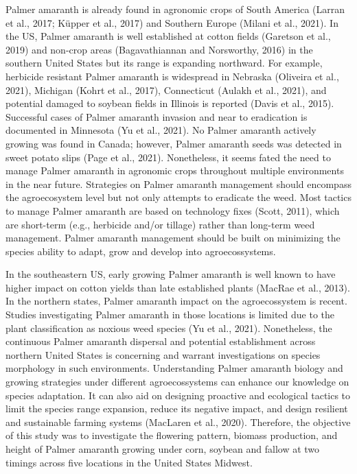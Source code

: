\documentclass[utf8]{frontiersSCNS}
\begin{document}
Palmer amaranth is already found in agronomic crops of South America
(Larran et al., 2017; Küpper et al., 2017) and Southern Europe (Milani
et al., 2021). In the US, Palmer amaranth is well established at cotton
fields (Garetson et al., 2019) and non-crop areas (Bagavathiannan and
Norsworthy, 2016) in the southern United States but its range is
expanding northward. For example, herbicide resistant Palmer amaranth is
widespread in Nebraska (Oliveira et al., 2021), Michigan (Kohrt et al.,
2017), Connecticut (Aulakh et al., 2021), and potential damaged to
soybean fields in Illinois is reported (Davis et al., 2015). Successful
cases of Palmer amaranth invasion and near to eradication is documented
in Minnesota (Yu et al., 2021). No Palmer amaranth actively growing was
found in Canada; however, Palmer amaranth seeds was detected in sweet
potato slips (Page et al., 2021). Nonetheless, it seems fated the need
to manage Palmer amaranth in agronomic crops throughout multiple
environments in the near future. Strategies on Palmer amaranth
management should encompass the agroecosystem level but not only
attempts to eradicate the weed. Most tactics to manage Palmer amaranth
are based on technology fixes (Scott, 2011), which are short-term (e.g.,
herbicide and/or tillage) rather than long-term weed management. Palmer
amaranth management should be built on minimizing the species ability to
adapt, grow and develop into agroecossystems.

In the southeastern US, early growing Palmer amaranth is well known to
have higher impact on cotton yields than late established plants (MacRae
et al., 2013). In the northern states, Palmer amaranth impact on the
agroecossystem is recent. Studies investigating Palmer amaranth in those
locations is limited due to the plant classification as noxious weed
species (Yu et al., 2021). Nonetheless, the continuous Palmer amaranth
dispersal and potential establishment across northern United States is
concerning and warrant investigations on species morphology in such
environments. Understanding Palmer amaranth biology and growing
strategies under different agroecossystems can enhance our knowledge on
species adaptation. It can also aid on designing proactive and
ecological tactics to limit the species range expansion, reduce its
negative impact, and design resilient and sustainable farming systems
(MacLaren et al., 2020). Therefore, the objective of this study was to
investigate the flowering pattern, biomass production, and height of
Palmer amaranth growing under corn, soybean and fallow at two timings
across five locations in the United States Midwest.
\end{document}
